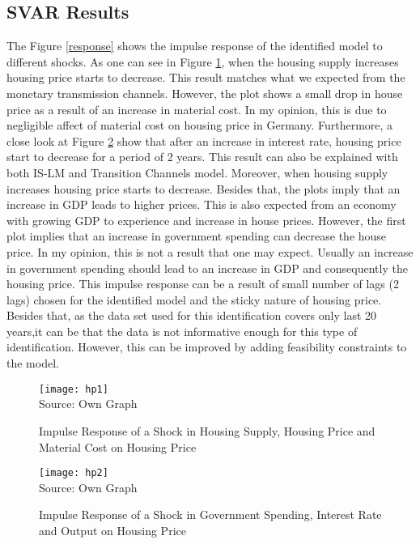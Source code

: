 \subsection{\ac{SVAR} Results}
The Figure \ref{response} shows the impulse response of the identified model to different shocks. As one can see in Figure \ref{imp1}, when the housing supply increases housing price starts to decrease. This result matches what we expected from the monetary transmission channels. However, the plot shows a small drop in house price as a result of an increase in material cost. In my opinion, this is due to negligible affect of material cost on housing price in Germany. 
Furthermore, a close look at Figure \ref{imp2} show that after an increase in interest rate, housing price start to decrease for a period of 2 years. This result can also be explained with both IS-LM and Transition Channels model. Moreover, when housing supply increases housing price starts to decrease. Besides that, the plots imply that an increase in GDP leads to higher prices. This is also expected from an economy with growing GDP to experience and increase in house prices. However, the first plot implies that an increase in government spending can decrease the house price. In my opinion, this is not a result that one may expect. Usually an increase in government spending should lead to an increase in GDP and consequently the housing price. This impulse response can be a result of small number of lags (2 lags) chosen for the identified model and the sticky nature of housing price. Besides that, as the data set used for this identification covers only last 20 years,it can be that the data is not informative enough for this type of identification. However, this can be improved by adding feasibility constraints to the model. 
\begin{figure}[H]
\label{imp1}
\caption{Impulse Response of a Shock in Housing Supply, Housing Price and Material Cost on Housing Price}
\texttt{[image: hp1]}
\\
Source: Own Graph
\end{figure}
\begin{figure}[H]
\label{imp2}
\caption{Impulse Response of a Shock in Government Spending, Interest Rate and Output on Housing Price}
\texttt{[image: hp2]}
\\
Source: Own Graph
\end{figure}


